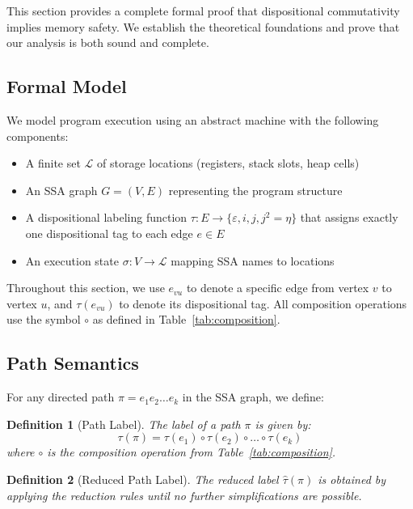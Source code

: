 \documentclass[acmsmall,anonymous,review,screen]{acmart}
\newtheorem{definition}{Definition}
\begin{document}
	This section provides a complete formal proof that dispositional commutativity implies memory safety. We establish the theoretical foundations and prove that our analysis is both sound and complete.
	
	\subsection{Formal Model}
	
	We model program execution using an abstract machine with the following components:
	\begin{itemize}
		\item A finite set $\mathcal{L}$ of storage locations (registers, stack slots, heap cells)
		\item An SSA graph $G = (V, E)$ representing the program structure
		\item A dispositional labeling function $\tau: E \to \{\varepsilon, i, j, j^{2} = \eta\}$ that assigns exactly one dispositional tag to each edge $e \in E$
		\item An execution state $\sigma: V \to \mathcal{L}$ mapping SSA names to locations
	\end{itemize}
	
	Throughout this section, we use $e_{vu}$ to denote a specific edge from vertex $v$ to vertex $u$, and $\tau(e_{vu})$ to denote its dispositional tag. All composition operations use the symbol $\circ$ as defined in Table~\ref{tab:composition}.
	
	\subsection{Path Semantics}
	
	For any directed path $\pi = e_1e_2 \ldots e_k$ in the SSA graph, we define:
	
	\begin{definition}[Path Label]
		The label of a path $\pi$ is given by:
		\begin{equation}
			\tau(\pi) = \tau(e_1) \circ \tau(e_2) \circ \ldots \circ \tau(e_k)
		\end{equation}
		where $\circ$ is the composition operation from Table~\ref{tab:composition}.
	\end{definition}
	
	\begin{definition}[Reduced Path Label]
		The reduced label $\hat{\tau}(\pi)$ is obtained by applying the reduction rules until no further simplifications are possible.
	\end{definition}
	
\end{document}
